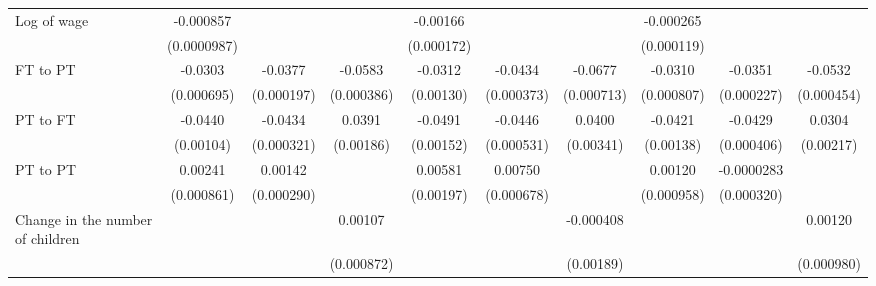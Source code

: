 {\begin{tabular}{l*{9}{c}}
\addlinespace
Log of wage         &   -0.000857\sym{***}&                     &                     &    -0.00166\sym{***}&                     &                     &   -0.000265\sym{**} &                     &                     \\
                    & (0.0000987)         &                     &                     &  (0.000172)         &                     &                     &  (0.000119)         &                     &                     \\
\addlinespace
FT to PT            &     -0.0303\sym{***}&     -0.0377\sym{***}&     -0.0583\sym{***}&     -0.0312\sym{***}&     -0.0434\sym{***}&     -0.0677\sym{***}&     -0.0310\sym{***}&     -0.0351\sym{***}&     -0.0532\sym{***}\\
                    &  (0.000695)         &  (0.000197)         &  (0.000386)         &   (0.00130)         &  (0.000373)         &  (0.000713)         &  (0.000807)         &  (0.000227)         &  (0.000454)         \\
\addlinespace
PT to FT            &     -0.0440\sym{***}&     -0.0434\sym{***}&      0.0391\sym{***}&     -0.0491\sym{***}&     -0.0446\sym{***}&      0.0400\sym{***}&     -0.0421\sym{***}&     -0.0429\sym{***}&      0.0304\sym{***}\\
                    &   (0.00104)         &  (0.000321)         &   (0.00186)         &   (0.00152)         &  (0.000531)         &   (0.00341)         &   (0.00138)         &  (0.000406)         &   (0.00217)         \\
\addlinespace
PT to PT            &     0.00241\sym{***}&     0.00142\sym{***}&                     &     0.00581\sym{***}&     0.00750\sym{***}&                     &     0.00120         &  -0.0000283         &                     \\
                    &  (0.000861)         &  (0.000290)         &                     &   (0.00197)         &  (0.000678)         &                     &  (0.000958)         &  (0.000320)         &                     \\
\addlinespace
Change in the number of children&                     &                     &     0.00107         &                     &                     &   -0.000408         &                     &                     &     0.00120         \\
                    &                     &                     &  (0.000872)         &                     &                     &   (0.00189)         &                     &                     &  (0.000980)         \\

\end{tabular}}
